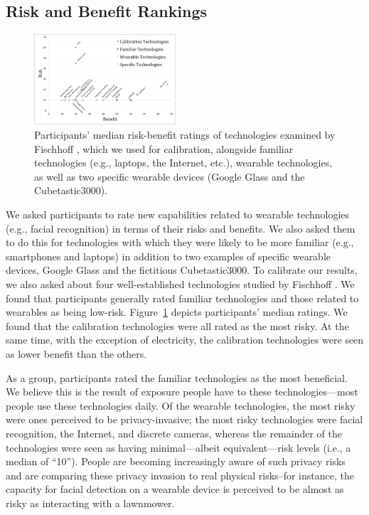 
\subsection{Risk and Benefit Rankings} 
\begin{figure}[t]
	\centering
	\includegraphics[width=0.47\textwidth]{images/riskbenefit.pdf}
	\caption{Participants' median risk-benefit ratings of technologies examined by Fischhoff \etal\cite{Fischhoff}, which we used for calibration, alongside familiar technologies (e.g., laptops, the Internet, etc.), wearable technologies, as well as two specific wearable devices (Google Glass and the Cubetastic3000).}
	\label{fig:techplot}
\end{figure}

We asked participants to rate new capabilities related to wearable technologies (e.g., facial recognition) in terms of their risks and benefits. We also asked them to do this for technologies with which they were likely to be more familiar (e.g., smartphones and laptops) in addition to two examples of specific wearable devices, Google Glass and the fictitious Cubetastic3000. To calibrate our results, we also asked about four well-established technologies studied by Fischhoff \etal\cite{Fischhoff}. We found that participants generally rated familiar technologies and those related to wearables as being low-risk. Figure~\ref{fig:techplot} depicts participants' median ratings. We found that the calibration technologies were all rated as the most risky. At the same time, with the exception of electricity, the calibration technologies were seen as lower benefit than the others.

As a group, participants rated the familiar technologies as the most beneficial. We believe this is the result of exposure people have to these technologies---most people use these technologies daily. Of the wearable technologies, the most risky were ones perceived to be privacy-invasive; the most risky technologies were facial recognition, the Internet, and discrete cameras, whereas the remainder of the technologies were seen as having minimal---albeit equivalent---risk levels (i.e., a median of ``10''). People are becoming increasingly aware of such privacy risks and are comparing these privacy invasion to real physical risks--for instance, the capacity for facial detection on a wearable device is perceived to be almost as risky as interacting with a lawnmower.

